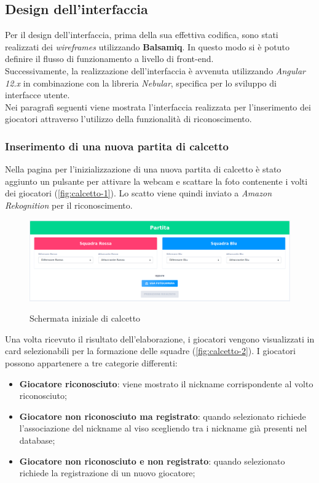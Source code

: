 		
		
	
	
	\subsection{Design dell'interfaccia}
	Per il design dell'interfaccia, prima della sua effettiva codifica, sono stati realizzati dei \emph{wireframes} utilizzando \textbf{Balsamiq}. In questo modo si è potuto definire il flusso di funzionamento a livello di front-end. \\ 

	\noindent Successivamente, la realizzazione dell'interfaccia è avvenuta utilizzando \emph{Angular 12.x} in combinazione con la libreria 
	\emph{Nebular}, specifica per lo sviluppo di interfacce utente. \\
	
	\noindent Nei paragrafi seguenti viene mostrata l'interfaccia realizzata per l'inserimento dei giocatori attraverso l'utilizzo della funzionalità di riconoscimento.
	
		\subsubsection{Inserimento di una nuova partita di calcetto}
		Nella pagina per l'inizializzazione di una nuova partita di calcetto è stato aggiunto un pulsante per attivare la webcam e scattare la foto  contenente i volti dei giocatori (\autoref{fig:calcetto-1}). Lo scatto viene quindi inviato a \emph{Amazon Rekognition} per il riconoscimento. 
		
		\begin{figure}[H]
			\centering
			\includegraphics[width=\textwidth]{immagini/calcetto-1.png} \\
			\caption{\label{fig:calcetto-1} Schermata iniziale di calcetto}
		\end{figure}
	
		\noindent Una volta ricevuto il risultato dell'elaborazione, i giocatori vengono visualizzati in card selezionabili per la formazione delle squadre (\autoref{fig:calcetto-2}). I giocatori possono appartenere a tre categorie differenti:
		\begin{itemize}
			\item \textbf{Giocatore riconosciuto}: viene mostrato il nickname corrispondente al volto riconosciuto;
			\item \textbf{Giocatore non riconosciuto ma registrato}: quando selezionato richiede l'associazione del nickname al viso scegliendo tra i nickname già presenti nel database; 
			\item\textbf{Giocatore non riconosciuto e non registrato}: quando selezionato richiede la registrazione di un nuovo giocatore; 
		\end{itemize}
	
